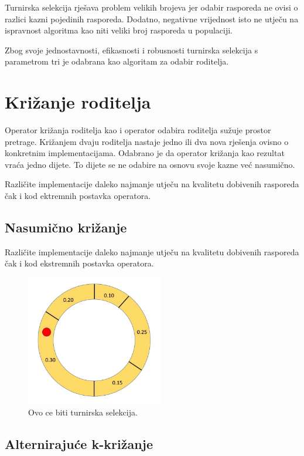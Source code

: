 \documentclass[times, utf8, zavrsni]{fer}
\begin{document}
Turnirska selekcija rješava problem velikih brojeva jer odabir rasporeda ne ovisi o razlici kazni pojedinih rasporeda. Dodatno, negativne vrijednost isto ne utječu na ispravnost algoritma kao niti veliki broj rasporeda u populaciji.

Zbog svoje jednostavnosti, efikasnosti i robusnosti turnirska selekcija s parametrom tri je odabrana kao algoritam za odabir roditelja.

\section{Križanje roditelja}

Operator križanja roditelja kao i operator odabira roditelja sužuje prostor pretrage. Križanjem dvaju roditelja nastaje jedno ili dva nova rješenja  ovisno o konkretnim implementacijama. Odabrano je da operator križanja kao rezultat vraća jedno dijete. To dijete se ne odabire na osnovu svoje kazne već nasumično.

Različite implementacije daleko najmanje utječu na kvalitetu dobivenih rasporeda čak i kod ektremnih postavka operatora.

\subsection{Nasumično križanje}

Različite implementacije daleko najmanje utječu na kvalitetu dobivenih rasporeda čak i kod ekstremnih postavka operatora.

\begin{figure}[htb]
\centering
\includegraphics[width=6cm]{images/rulet.png}
\caption{Ovo ce biti turnirska selekcija.}
\label{fig:rulet}
\end{figure}

\subsection{Alternirajuće k-križanje}
\end{document}
